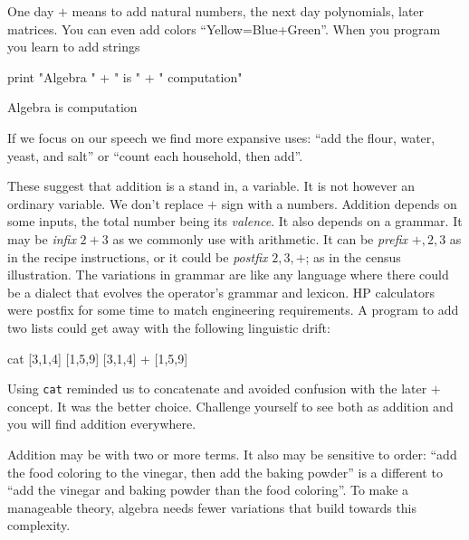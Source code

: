 

One day  $+$ means to add natural numbers, the next day 
polynomials, later matrices.  
You can even add colors ``Yellow=Blue+Green''. When you program 
you learn to add strings
\begin{center}
\begin{notebookin}
print "Algebra " + " is " + " computation"
\end{notebookin}
\begin{notebookout}
Algebra is computation
\end{notebookout}
\end{center}
If we focus on our 
speech we find more expansive uses:
``add the flour, water, yeast, and salt'' or  
``count each household, then add''.  

These suggest that addition is a stand in, a variable.  It is not however 
an ordinary variable.  We don't replace $+$ sign with a numbers.  
Addition depends on some inputs, the total 
number being its \emph{valence}.    It also depends on a grammar.
It may be \emph{infix} $2+3$ as we commonly 
use with arithmetic.  It can be \emph{prefix} $+,2,3$ as in the recipe instructions,
or it could be \emph{postfix} $2,3,+$; as in the census illustration.  
The variations in grammar are like any language 
where there could be a dialect that evolves the operator's grammar and lexicon.
 HP calculators were postfix for some time to match engineering requirements.
A program to add two lists could get away with the following linguistic drift:
\begin{center}
\begin{notebookin}
cat [3,1,4] [1,5,9]
[3,1,4] + [1,5,9]
\end{notebookin}
\begin{notebookout}[2]
[3,1,4,1,5,9]
[4,6,13]
\end{notebookout}
\end{center}
Using \texttt{cat} reminded us to concatenate and avoided confusion with the
later $+$ concept.  It was the better choice. Challenge yourself to see both as
addition and you will find addition everywhere. 

Addition  may be with two or more terms.  It also may be 
sensitive to order: ``add the food coloring to the vinegar, then add the baking
powder'' is a different to ``add the vinegar and baking powder than the
food coloring''.  To make a manageable theory, algebra needs fewer variations that 
build towards this complexity.



